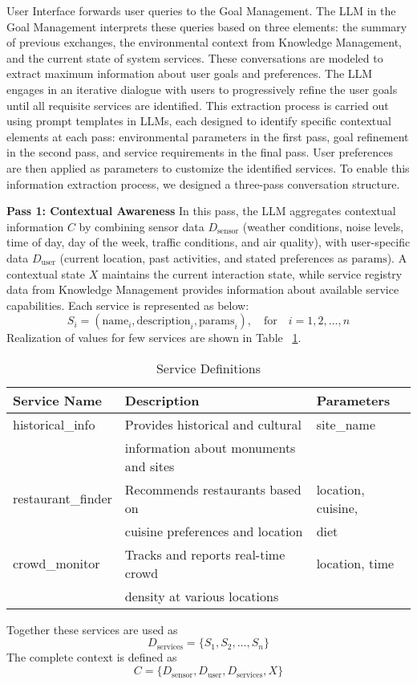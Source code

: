 User Interface forwards user queries to the Goal Management. The LLM in the Goal Management interprets these queries based on three elements: the summary of previous exchanges, the environmental context from Knowledge Management, and the current state of system services. These conversations are modeled to extract maximum information about user goals and preferences. The LLM engages in an iterative dialogue with users to progressively refine the user goals until all requisite services are identified. This extraction process is carried out using prompt templates in LLMs, each designed to identify specific contextual elements at each pass: environmental parameters in the first pass, goal refinement in the second pass, and service requirements in the final pass. User preferences are then applied as parameters to customize the identified services. To enable this information extraction process, we designed a three-pass conversation structure.

\textbf{Pass 1: Contextual Awareness} 
In this pass, the LLM aggregates contextual information $C$ by combining sensor data $D_{\text{sensor}}$ (weather conditions, noise levels, time of day, day of the week, traffic conditions, and air quality), with user-specific data $D_{\text{user}}$ (current location, past activities, and stated preferences as $\text{params}$). A contextual state $X$ maintains the current interaction state, while service registry data from Knowledge Management provides information about available service capabilities. Each service is represented as below:
\[
S_i = ( \text{name}_i, \text{description}_i, \text{params}_i ), \quad \text{for} \quad i = 1, 2, \dots, n
\]
 Realization of values for few services are shown in Table ~\ref{tab:service-definitions}.
\begin{table}[ht]
\setlength{\tabcolsep}{2pt}
\caption{Service Definitions\protect\footnotemark}
\label{tab:service-definitions}
\centering
\begin{tabular}{lll}
\toprule
\textbf{Service Name} & \textbf{Description} & \textbf{Parameters} \\
\midrule
historical\_info & Provides historical and cultural & site\_name \\
 & information about monuments and sites & \\ \hline
restaurant\_finder & Recommends restaurants based on & location, cuisine, \\
 & cuisine preferences and location & diet \\ \hline
crowd\_monitor & Tracks and reports real-time crowd & location, time \\
 & density at various locations & \\ 
\bottomrule
\end{tabular}
\end{table}
Together these services are used as 
\[
D_{\text{services}} = \{ S_1, S_2, \dots, S_n \}
\]
The complete context is defined as \[C = \{D_{\text{sensor}}, D_{\text{user}}, D_{\text{services}}, X\}\]

